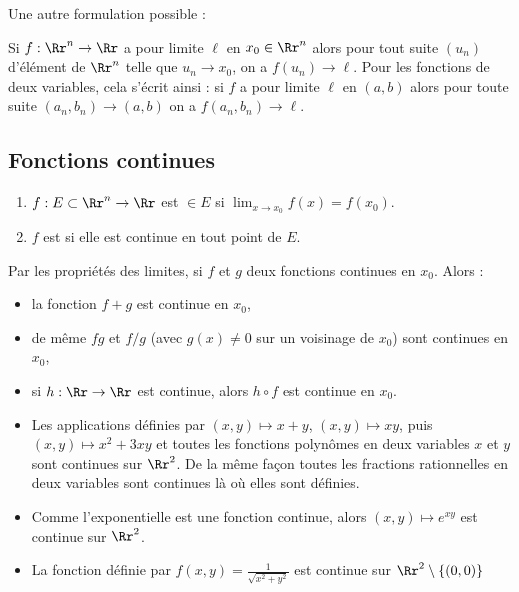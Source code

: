 \documentclass[12pt, class=report,crop=false]{standalone}
\begin{document}
\bigskip
\bigskip

Une autre formulation possible : 

Si $f : \Rr^n\to \Rr$ a pour limite $\ell$ en $x_0 \in \Rr^n$ alors
pour tout suite $(u_n)$ d'élément de $\Rr^n$ telle que $u_n \to x_0$, on a $f(u_n) \to \ell$. 
Pour les fonctions de deux variables, cela s'écrit ainsi :
si $f$ a pour limite $\ell$ en $(a,b)$ alors pour toute suite
$(a_n,b_n) \to (a,b)$ on a $f(a_n,b_n) \to \ell$.


\subsection{Fonctions continues}


\begin{definition}
\sauteligne
\begin{enumerate}
\item $f : E \subset \Rr^n \rightarrow \Rr$ est  $\in E$ si $\displaystyle \lim_{x \rightarrow x_0} f(x) = f(x_0)$.
\item $f$ est  si elle est continue en tout point de $E$.
\end{enumerate}
\end{definition}

Par les propriétés des limites, si $f$ et $g$ deux fonctions continues en $x_0$. Alors : 
\begin{itemize}
\item la fonction $f + g$ est continue en $x_0$,
\item de même $fg$ et $f/g$ (avec $g(x) \neq 0$ sur un voisinage de $x_0$)  sont continues en $x_0$,
\item si $h : \Rr \to \Rr$ est continue, alors $h \circ f$ est continue en $x_0$.
\end{itemize}

\begin{exemple}
\sauteligne
\begin{itemize}
  \item Les applications définies par $(x,y)\mapsto x+y$, $(x,y)\mapsto xy$, puis 
  $(x,y)\mapsto x^2+3xy$ et toutes les fonctions polynômes en deux variables $x$ et $y$ 
  sont continues sur $\Rr^2$. De la même façon toutes les fractions rationnelles 
  en deux variables sont continues là où elles sont définies.
  
  \item Comme l'exponentielle est une fonction continue, alors $(x,y)\mapsto e^{xy}$ est continue sur $\Rr^2$.
  
  \item La fonction définie par $f(x,y) = \frac{1}{\sqrt{x^2 + y^2}}$ est continue sur $\Rr^2\setminus\{(0,0)\}$
\end{itemize}
\end{exemple}
  
\end{document}
